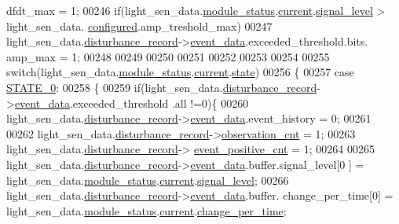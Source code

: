 \begin{DoxyCode}
      dfdt\_max = 1;
00246     \textcolor{keywordflow}{if}(light\_sen\_data.\hyperlink{a00024_a5a53c391562b059eb744ac679f3765ca}{module\_status}.\hyperlink{a00017_ab8af48cdbba92b3ae39c4470e53af944}{current}.\hyperlink{a00017_abcdf2bc0c2e5a14863938ae28c3bc96e}{signal\_level} > light\_sen\_data.
      \hyperlink{a00024_a94b2d1f6ea4ab334c74d24984dd27843}{configured}.amp\_treshold\_max)
00247         light\_sen\_data.\hyperlink{a00024_ac9b38e2c1d3f1013a88d33506c754152}{disturbance\_record}->\hyperlink{a00028_a8c0bda69e71ef674e60da47ad0be9ab0}{event\_data}.exceeded\_threshold.bits.
      amp\_max = 1;
00248 
00249 
00250 
00251 
00252 
00253 
00254  
00255     \textcolor{keywordflow}{switch}(light\_sen\_data.\hyperlink{a00024_a5a53c391562b059eb744ac679f3765ca}{module\_status}.\hyperlink{a00017_ab8af48cdbba92b3ae39c4470e53af944}{current}.\hyperlink{a00017_a6b8d8e916bc56265a3fd279bd26b6d1b}{state})
00256     \{
00257         \textcolor{keywordflow}{case} \hyperlink{a00021_ad6739dbbe5581cac99b7dc8a5e09949c}{STATE\_0}:
00258         \{
00259             \textcolor{keywordflow}{if}(light\_sen\_data.\hyperlink{a00024_ac9b38e2c1d3f1013a88d33506c754152}{disturbance\_record}->\hyperlink{a00028_a8c0bda69e71ef674e60da47ad0be9ab0}{event\_data}.exceeded\_threshold
      .all !=0)\{
00260               light\_sen\_data.\hyperlink{a00024_ac9b38e2c1d3f1013a88d33506c754152}{disturbance\_record}->\hyperlink{a00028_a8c0bda69e71ef674e60da47ad0be9ab0}{event\_data}.event\_history    = 
      0;
00261 
00262             light\_sen\_data.\hyperlink{a00024_ac9b38e2c1d3f1013a88d33506c754152}{disturbance\_record}->\hyperlink{a00028_ad5b0bac02ce266b91b2b52a1c3ea1d78}{observation\_cnt}    = 1;
00263             light\_sen\_data.\hyperlink{a00024_ac9b38e2c1d3f1013a88d33506c754152}{disturbance\_record}->
      \hyperlink{a00028_a7397b9d76d4b57500f27bb23d258a18a}{event\_positive\_cnt} = 1;
00264 
00265             light\_sen\_data.\hyperlink{a00024_ac9b38e2c1d3f1013a88d33506c754152}{disturbance\_record}->\hyperlink{a00028_a8c0bda69e71ef674e60da47ad0be9ab0}{event\_data}.buffer.signal\_level[0
      ] = light\_sen\_data.\hyperlink{a00024_a5a53c391562b059eb744ac679f3765ca}{module\_status}.\hyperlink{a00017_ab8af48cdbba92b3ae39c4470e53af944}{current}.\hyperlink{a00017_abcdf2bc0c2e5a14863938ae28c3bc96e}{signal\_level};
00266             light\_sen\_data.\hyperlink{a00024_ac9b38e2c1d3f1013a88d33506c754152}{disturbance\_record}->\hyperlink{a00028_a8c0bda69e71ef674e60da47ad0be9ab0}{event\_data}.buffer.
      change\_per\_time[0] = light\_sen\_data.\hyperlink{a00024_a5a53c391562b059eb744ac679f3765ca}{module\_status}.\hyperlink{a00017_ab8af48cdbba92b3ae39c4470e53af944}{current}.\hyperlink{a00017_ad5c4f9a39d2a36632a53205ae8eb5a5d}{change\_per\_time};

\end{DoxyCode}
